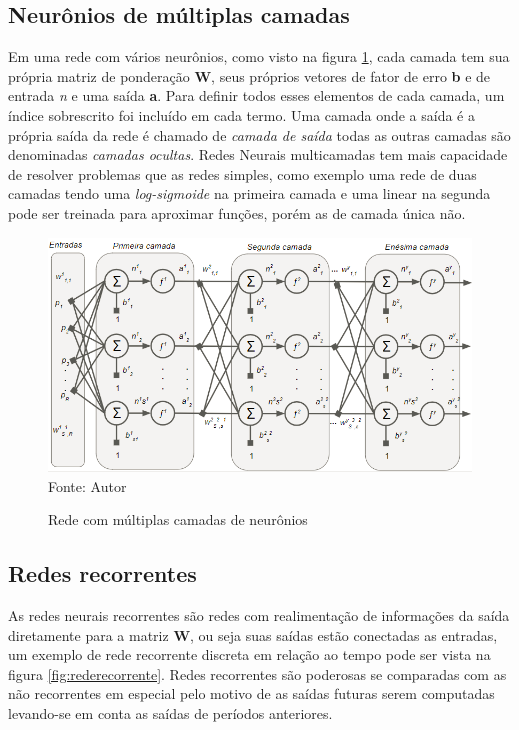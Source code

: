 \documentclass[
	12pt,				%
    oneside,			%
	a4paper,			%
	english,			%
	french,				%
	spanish,			%
	brazil,				%
	]{abntex2}
\begin{document}
\subsection {Neurônios de múltiplas camadas} 

Em uma rede com vários neurônios, como visto na figura \ref{fig:Neuronio_multipla_camada}, cada camada tem sua própria matriz de ponderação \textbf{W}, seus próprios vetores de fator de erro \textbf{b} e de entrada \textit{n} e uma saída \textbf{a}. Para definir todos esses elementos de cada camada, um índice sobrescrito foi incluído em cada termo. Uma camada onde a saída é a própria saída da rede é chamado de \textit{camada de saída} todas as outras camadas são denominadas \textit{camadas ocultas}. 
Redes Neurais multicamadas tem mais capacidade de resolver problemas que as redes simples, como exemplo uma rede de duas camadas tendo uma \textit{log-sigmoide} na primeira camada e uma linear na segunda pode ser treinada para aproximar funções, porém as de camada única não. 

\begin{figure}[H]
    \centering
    \caption{Rede com múltiplas camadas de neurônios}
    \includegraphics[scale=0.65]{neuronio_multi_camada1}\\
    Fonte: Autor\hfill
    \label{fig:Neuronio_multipla_camada}
\end{figure}

\subsection {Redes recorrentes}

As redes neurais recorrentes são redes com realimentação de informações da saída diretamente para a matriz \textbf{W}, ou seja suas saídas estão conectadas as entradas, um exemplo de rede recorrente discreta em relação ao tempo pode ser vista na figura \ref{fig:rederecorrente}. Redes recorrentes são poderosas se comparadas com as não recorrentes em especial pelo motivo de as saídas futuras serem computadas levando-se em conta as saídas de períodos anteriores.
\end{document}
